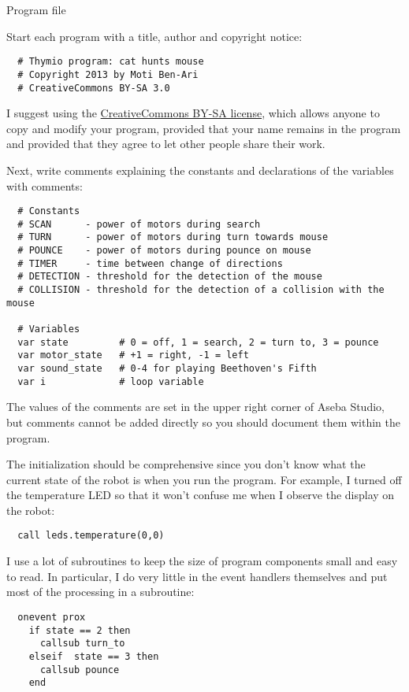 
{\raggedleft \hfill Program file }

Start each program with a title, author and copyright notice:
\begin{verbatim}
  # Thymio program: cat hunts mouse
  # Copyright 2013 by Moti Ben-Ari
  # CreativeCommons BY-SA 3.0
\end{verbatim}

I suggest using the
\href{http://creativecommons.org/licenses/by-sa/3.0/}{CreativeCommons
BY-SA license}, which allows anyone to copy and modify your program,
provided that your name remains in the program and provided that they
agree to let other people share their work.

Next, write comments explaining the constants and declarations of the
variables with comments:
\begin{verbatim}
  # Constants
  # SCAN      - power of motors during search
  # TURN      - power of motors during turn towards mouse
  # POUNCE    - power of motors during pounce on mouse
  # TIMER     - time between change of directions
  # DETECTION - threshold for the detection of the mouse
  # COLLISION - threshold for the detection of a collision with the mouse

  # Variables
  var state         # 0 = off, 1 = search, 2 = turn to, 3 = pounce
  var motor_state   # +1 = right, -1 = left
  var sound_state   # 0-4 for playing Beethoven's Fifth
  var i             # loop variable
\end{verbatim}

The values of the comments are set in the upper right corner of Aseba
Studio, but comments cannot be added directly so you should document
them within the program.

The initialization should be comprehensive since you don't know what the
current state of the robot is when you run the program. For example, I
turned off the temperature LED so that it won't confuse me when I
observe the display on the robot:

\begin{verbatim}
  call leds.temperature(0,0)
\end{verbatim}

I use a lot of subroutines to keep the size of program components small
and easy to read. In particular, I do very little in the event handlers
themselves and put most of the processing in a subroutine:
\begin{verbatim}
  onevent prox
    if state == 2 then
      callsub turn_to
    elseif  state == 3 then
      callsub pounce
    end
\end{verbatim}

